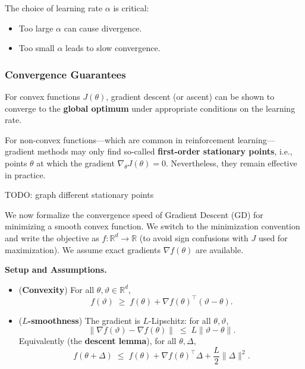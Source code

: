 \documentclass[
]{book}
\providecommand{\tightlist}{%
  \setlength{\itemsep}{0pt}\setlength{\parskip}{0pt}}
\theoremstyle{definition}
\theoremstyle{definition}
\theoremstyle{definition}
\theoremstyle{definition}
\theoremstyle{remark}
\begin{document}
The choice of learning rate \(\alpha\) is critical:

\begin{itemize}
\tightlist
\item
  Too large \(\alpha\) can cause divergence.\\
\item
  Too small \(\alpha\) leads to slow convergence.
\end{itemize}

\subsubsection{Convergence Guarantees}\label{convergence-guarantees}

For convex functions \(J(\theta)\), gradient descent (or ascent) can be shown to converge to the \textbf{global optimum} under appropriate conditions on the learning rate.

For non-convex functions---which are common in reinforcement learning---gradient methods may only find so-called \textbf{first-order stationary points}, i.e., points \(\theta\) at which the gradient \(\nabla_\theta J(\theta) = 0\). Nevertheless, they remain effective in practice.

{TODO: graph different stationary points}

We now formalize the convergence speed of Gradient Descent (GD) for minimizing a smooth convex function. We switch to the minimization convention and write the objective as \(f:\mathbb{R}^d \to \mathbb{R}\) (to avoid sign confusions with \(J\) used for maximization). We assume exact gradients \(\nabla f(\theta)\) are available.

\textbf{Setup and Assumptions.}

\begin{itemize}
\item
  (\textbf{Convexity}) For all \(\theta,\vartheta\in\mathbb{R}^d\),
  \begin{equation}
  f(\vartheta) \;\ge\; f(\theta) + \nabla f(\theta)^\top(\vartheta-\theta).
  \label{eq:PG-GO-convexity}
  \end{equation}
\item
  (\textbf{\(L\)-smoothness}) The gradient is \(L\)-Lipschitz: for all \(\theta,\vartheta\),
  \begin{equation}
  \|\nabla f(\vartheta)-\nabla f(\theta)\| \;\le\; L\|\vartheta-\theta\|.
  \label{eq:PG-GO-Lsmooth}
  \end{equation}
  Equivalently (the \textbf{descent lemma}), for all \(\theta,\Delta\),
  \begin{equation}
  f(\theta+\Delta) \;\le\; f(\theta) + \nabla f(\theta)^\top \Delta + \frac{L}{2}\|\Delta\|^2.
  \label{eq:PG-GO-descent-lemma}
  \end{equation}
\end{itemize}
\end{document}
